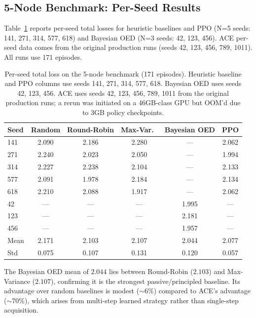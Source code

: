 \subsection{5-Node Benchmark: Per-Seed Results}
\label{app:5node-detail}

Table~\ref{tab:5node-perseed} reports per-seed total losses for heuristic baselines and PPO (N=5 seeds: 141, 271, 314, 577, 618) and Bayesian OED (N=3 seeds: 42, 123, 456). ACE per-seed data comes from the original production runs (seeds 42, 123, 456, 789, 1011). All runs use 171 episodes.

\begin{table}[h]
\centering
\caption{Per-seed total loss on the 5-node benchmark (171 episodes). Heuristic baseline and PPO columns use seeds 141, 271, 314, 577, 618. Bayesian OED uses seeds 42, 123, 456. ACE uses seeds 42, 123, 456, 789, 1011 from the original production runs; a rerun was initiated on a 46GB-class GPU but OOM'd due to 3GB policy checkpoints.}
\label{tab:5node-perseed}
\small
\begin{tabular}{@{}l ccc cc@{}}
\toprule
Seed & Random & Round-Robin & Max-Var.\ & Bayesian OED & PPO \\
\midrule
141 & 2.090 & 2.186 & 2.280 & ---   & 2.062 \\
271 & 2.240 & 2.023 & 2.050 & ---   & 1.994 \\
314 & 2.227 & 2.238 & 2.104 & ---   & 2.133 \\
577 & 2.091 & 1.978 & 2.184 & ---   & 2.134 \\
618 & 2.210 & 2.088 & 1.917 & ---   & 2.062 \\
42  & ---   & ---   & ---   & 1.995 & ---   \\
123 & ---   & ---   & ---   & 2.181 & ---   \\
456 & ---   & ---   & ---   & 1.957 & ---   \\
\midrule
Mean & 2.171 & 2.103 & 2.107 & 2.044 & 2.077 \\
Std  & 0.075 & 0.107 & 0.131 & 0.120 & 0.057 \\
\bottomrule
\end{tabular}
\end{table}

The Bayesian OED mean of $2.044$ lies between Round-Robin ($2.103$) and Max-Variance ($2.107$), confirming it is the strongest passive/principled baseline. Its advantage over random baselines is modest ($\sim$6\%) compared to ACE's advantage ($\sim$70\%), which arises from multi-step learned strategy rather than single-step acquisition.

